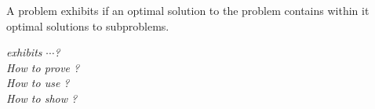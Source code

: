 
\begin{frame}{}
  \begin{definition}
    A problem exhibits \textbf{\emph{}} if
    an optimal solution to the problem contains within it optimal solutions to subproblems.
  \end{definition}

  \pause
  \vspace{0.30cm}
  \begin{center}
    {\it {} exhibits $\cdots$?} \\[8pt] \pause
    {\it How to prove ?} \\[8pt] \pause
    {\it How to use ?} \\[8pt] \pause
    {\it How to show ?}  \\[30pt]

    \pause
  \end{center}
\end{frame}
